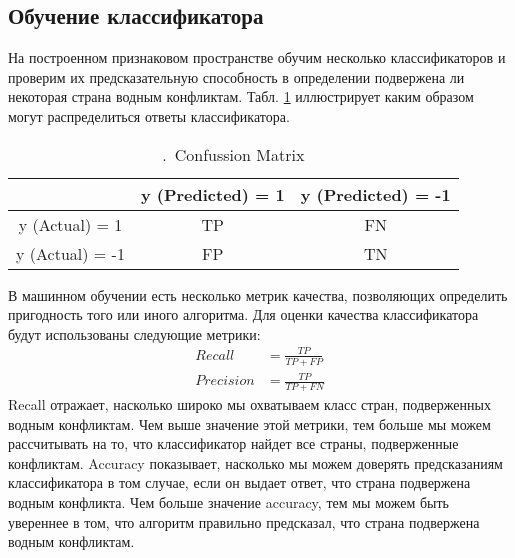 \documentclass[a4paper, 12pt]{article}
\theoremstyle{plain} %
\theoremstyle{definition} %
\theoremstyle{remark} %
\begin{document}
\subsection{Обучение классификатора}
На построенном признаковом пространстве обучим несколько классификаторов и проверим их предсказательную способность в определении подвержена ли некоторая страна водным конфликтам. Табл. \ref{confussion} иллюстрирует каким образом могут распределиться ответы классификатора.
\begin{table}[]
	\centering
	\caption{.\, Confussion Matrix}
	\label{confussion}
	\begin{tabular}{|c|c|c|}
		\hline
		& y (Predicted) = 1 & y (Predicted) = -1 \\ \hline
		y (Actual) = 1  & TP                & FN                 \\ \hline
		y (Actual) = -1 & FP                & TN                 \\ \hline
	\end{tabular}
\end{table}
В машинном обучении есть несколько метрик качества, позволяющих определить пригодность того или иного алгоритма. Для оценки качества классификатора будут использованы следующие метрики:
\begin{equation} \label{eq:2}
\begin{aligned}
Recall &= \frac{TP}{TP + FP} \\
Precision &= \frac{TP}{TP + FN}
\end{aligned}
\end{equation}
Recall отражает, насколько широко мы охватываем класс стран, подверженных водным конфликтам. Чем выше значение этой метрики, тем больше мы можем рассчитывать на то, что классификатор найдет все страны, подверженные конфликтам. Accuracy показывает, насколько мы можем доверять предсказаниям классификатора в том случае, если он выдает ответ, что страна подвержена водным конфликта. Чем больше значение accuracy, тем мы можем быть увереннее в том, что алгоритм правильно предсказал, что страна подвержена водным конфликтам.
\end{document}
